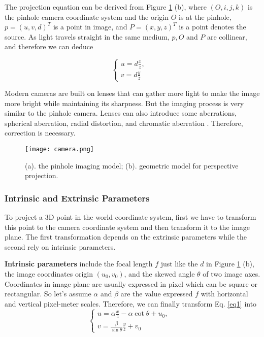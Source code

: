 The projection equation can be derived from Figure \ref{figure:camera} (b), where $ (O, i, j, k) $ is the pinhole camera coordinate system and the origin $O$ is at the pinhole,  $p=(u, v, d)^T$ is a point in image, and   $P=(x, y, z)^T$ is a point denotes the source. As light travels straight in the same medium, $p, O$ and $P$ are collinear, and therefore we can deduce  

\begin{equation}
\label{eq1}
	\begin{cases}
	u = d\frac{x}{z}, & \\    
	v = d\frac{y}{z}   
	\end{cases}
\end{equation}

Modern cameras are built on lenses that can gather more light to make the image more bright while maintaining its sharpness. But the imaging process is very similar to the pinhole camera. Lenses can also introduce some aberrations, \eg spherical aberration, radial distortion, and chromatic aberration \cite{Forsyth:2002:CVM:580035}. Therefore, correction is necessary.

\begin{figure}[h]		
	\texttt{[image: camera.png]}
	\caption{(a). the pinhole imaging model; (b). geometric model for perspective projection. \cite{Forsyth:2002:CVM:580035}}
	\centering
	\label{figure:camera}
\end{figure}

\subsubsection{Intrinsic and Extrinsic Parameters}
\label{projection}

To project a 3D point in the world coordinate system, first we have to transform this point to the camera coordinate system and then transform it to the image plane. The first transformation depends on the extrinsic parameters while the second rely on intrinsic parameters.

\textbf{Intrinsic parameters} include the focal length $f$ just like the $d$ in Figure \ref{figure:camera} (b), the image coordinates origin $(u_0, v_0)$, and the skewed angle $\theta$ of two image axes. Coordinates in image plane are usually expressed in pixel which can be square or rectangular. So let's assume $\alpha$ and $\beta$ are the value expressed $f$ with horizontal and vertical pixel-meter scales. Therefore, we can finally transform Eq. \ref{eq1} into 
\begin{equation}
\label{eq2}
	\begin{cases}
	u = \alpha \frac{x}{z} - \alpha \cot\theta + u_0, & \\    
	v = \frac{\beta}{\sin\theta} \frac{y}{z} + v_0
	\end{cases}
\end{equation}

